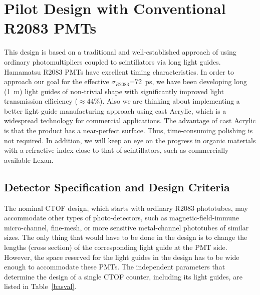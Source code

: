 \section{Pilot Design with Conventional R2083 PMTs}
\label{design2083}

This design is based on a traditional and well-established approach of using 
ordinary photomultipliers coupled to scintillators via long light guides.
Hamamatsu R2083 PMTs have excellent timing characteristics.  In order to 
approach our goal for the effective $\sigma_{R2083}$=72~ps, we have been 
developing long (1~m) light guides of non-trivial shape with significantly 
improved light transmission efficiency ($\approx$44\%).  Also we are thinking 
about implementing a better light guide manufacturing approach using cast Acrylic,
which is a widespread technology for commercial applications.  The advantage of 
cast Acrylic is that the product has a near-perfect surface.  Thus, time-consuming 
polishing is not required.  In addition, we will keep an eye on the progress in 
organic materials with a refractive index close to that of scintillators, such as 
commercially available Lexan.   

\subsection{Detector Specification and Design Criteria}
\label{sbasval}

The nominal CTOF design, which starts with ordinary R2083 phototubes, may 
accommodate other types of photo-detectors, such as magnetic-field-immune 
micro-channel, fine-mesh, or more sensitive metal-channel phototubes of 
similar sizes.  The only thing that would have to be done in the design is
to change the lengths (cross section) of the corresponding light guide at 
the PMT side.  However, the space reserved for the light guides in the 
design has to be wide enough to accommodate these PMTs.  The independent 
parameters that determine the design of a single CTOF counter, including its 
light guides, are listed in Table~\ref{basval}.

